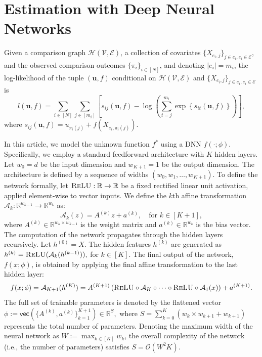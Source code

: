 \documentclass[
  12pt]{article}
\begin{document}
\section{Estimation with Deep Neural Networks}

Given a comparison graph $\mathcal{H}(\mathcal{V}, \mathcal{E})$, a collection of covariates $\{X_{e_i, j}\}_{j \in e_i, e_i \in \mathcal{E}}$, and the observed comparison outcomes $\{\pi_i\}_{i \in [N]}$, and denoting $|e_i| = m_i$, the log-likelihood of the tuple $(\boldsymbol{u}, f)$ conditional on $\mathcal{H}(\mathcal{V}, \mathcal{E})$ and $\{X_{e_i, j}\}_{j \in e_i, e_i \in \mathcal{E}}$ is 
\begin{equation}
l(\boldsymbol{u}, f) = \sum_{i \in [N]} \sum_{j \in [m_i]} \left[ s_{ij}(\boldsymbol{u}, f) - \log \left( \sum_{t=j}^{m_i} \exp \left\{ s_{it}(\boldsymbol{u}, f) \right\} \right) \right], \label{eq:mle}
\end{equation}
\noindent where $s_{ij}(\boldsymbol{u}, f) = u_{\pi_i(j)} + f(X_{e_i, \pi_i(j)})$.

In this article, we model the unknown function $f^*$ using a DNN $f(\cdot; \phi)$. Specifically, we employ a standard feedforward architecture with $K$ hidden layers. Let $w_0 = d$ be the input dimension and $w_{K+1} = 1$ be the output dimension. The architecture is defined by a sequence of widths $(w_0, w_1, \ldots, w_{K+1})$. To define the network formally, let $\textsc{ReLU}: \mathbb{R} \to \mathbb{R}$ be a fixed rectified linear unit activation, applied element-wise to vector inputs. We define the $k$th affine transformation $\mathcal{A}_k: \mathbb{R}^{w_{k-1}} \to \mathbb{R}^{w_k}$ as:
\begin{equation}
    \mathcal{A}_k(z) = A^{(k)} z + a^{(k)}, \quad \text{for } k \in [K+1],
\end{equation}
where $A^{(k)} \in \mathbb{R}^{w_k \times w_{k-1}}$ is the weight matrix and $a^{(k)} \in \mathbb{R}^{w_k}$ is the bias vector. The computation of the network propagates through the hidden layers recursively. Let $h^{(0)} = X$. The hidden features $h^{(k)}$ are generated as
$h^{(k)} = \textsc{ReLU} ( \mathcal{A}_k( h^{(k-1)} ) ),$ for $ k \in [K]$. The final output of the network, $f(x; \phi)$, is obtained by applying the final affine transformation to the last hidden layer:
\begin{equation}
\label{DNN_functional}
    f(x; \phi) = \mathcal{A}_{K+1}(h^{(K)}) = A^{(K+1)} \left( \textsc{ReLU} \circ \mathcal{A}_K \circ \cdots \circ \textsc{ReLU} \circ \mathcal{A}_1 (x) \right) + a^{(K+1)}.
\end{equation}
The full set of trainable parameters is denoted by the flattened vector $\phi := \mathsf{vec}( \{ A^{(k)}, a^{(k)} \}_{k=1}^{K+1} ) \in \mathbb{R}^S,$ where $S = \sum_{k=0}^{K} (w_k \times w_{k+1} + w_{k+1})$ represents the total number of parameters. Denoting the maximum width of the neural network as $W:=\max_{k\in[K]} w_k$, the overall complexity of the network (i.e., the number of parameters) satisfies $S = \mathcal{O}(W^2 K)$.
\end{document}

